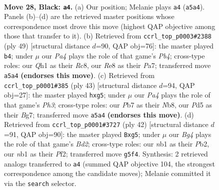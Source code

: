\documentclass[11pt]{article}
\begin{document}
\clearpage

\begin{figure}[p]\centering
\begin{subfigure}{0.46\textwidth}\centering
\resizebox{\linewidth}{!}{%
\newchessgame
\chessboard[
  setfen={r3r3/1pp3kp/5p2/p2p2b1/6b1/NPBKP3/P4P2/RN5q b - - 1 28},
  showmover=false,
  pgfstyle=straightmove, color=movearrow, markmove={a5-a4}
]}
\caption{}
\end{subfigure}\hfill
\begin{subfigure}{0.46\textwidth}\centering
\resizebox{\linewidth}{!}{%
\newchessgame
\chessboard[
  setfen={2r3k1/p2bppbp/6p1/1p1B4/6P1/1PN4P/P1RB1P2/6K1 b - - 0 25},
  showmover=false,
  pgfstyle=straightmove, color=movearrow, markmove={b5-b4}
]}
\caption{}
\end{subfigure}
\\[4pt]
\begin{subfigure}{0.46\textwidth}\centering
\resizebox{\linewidth}{!}{%
\newchessgame
\chessboard[
  setfen={1nb3k1/6b1/p3p2p/1p4N1/r3N3/2P5/PP4PP/R2B1K2 b - - 2 22},
  showmover=false,
  pgfstyle=straightmove, color=movearrow, markmove={h6-g5}
]}
\caption{}
\end{subfigure}\hfill
\begin{subfigure}{0.46\textwidth}\centering
\resizebox{\linewidth}{!}{%
\newchessgame
\chessboard[
  setfen={3r4/p4pkp/1rnpp3/6p1/2BbP3/7P/RP1B1PP1/3R2K1 w - - 0 22},
  showmover=false,
  pgfstyle=straightmove, color=movearrow, markmove={d2-g5}
]}
\caption{}
\end{subfigure}
\caption{\textbf{Move 28, Black: \texttt{a4}.} (a) Our position; Melanie plays \texttt{a4} (\texttt{a5a4}). Panels (b)--(d) are the retrieved master positions whose correspondence most drove this move (highest QAP objective among those that transfer to it). (b) Retrieved from \texttt{ccrl\_top\_p0003\#2388} (ply 49) [structural distance $d$=90, QAP obj=76]: the master played \texttt{b4}; under $\mu$ our \emph{Pa4} plays the role of that game's \emph{Pb4}; cross-type roles: our \emph{Q}h1 as their \emph{R}c8, our \emph{R}e8 as their \emph{P}a7; transferred move \texttt{a5a4} \textbf{(endorses this move)}. (c) Retrieved from \texttt{ccrl\_top\_p0001\#385} (ply 43) [structural distance $d$=94, QAP obj=27]: the master played \texttt{hxg5}; under $\mu$ our \emph{Pa4} plays the role of that game's \emph{Ph3}; cross-type roles: our \emph{P}b7 as their \emph{N}b8, our \emph{P}d5 as their \emph{B}g7; transferred move \texttt{a5a4} \textbf{(endorses this move)}. (d) Retrieved from \texttt{ccrl\_top\_p0001\#3727} (ply 42) [structural distance $d$=91, QAP obj=90]: the master played \texttt{Bxg5}; under $\mu$ our \emph{Bg4} plays the role of that game's \emph{Bd2}; cross-type roles: our \emph{n}b1 as their \emph{P}b2, our \emph{n}b1 as their \emph{P}f2; transferred move \texttt{g5f4}. Synthesis: 2 retrieved analogs transferred to \texttt{a4} (summed QAP objective 104, the strongest correspondence among the candidate moves); Melanie committed it via the \texttt{search} selector.}
\label{fig:thought-m55}
\end{figure}
\end{document}
